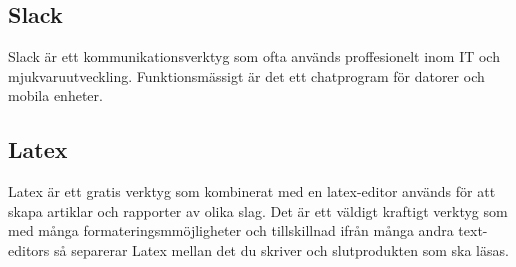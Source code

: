 \subsection*{Slack}
Slack är ett kommunikationsverktyg som ofta används proffesionelt inom IT och mjukvaruutveckling. Funktionsmässigt är det ett chatprogram för datorer och mobila enheter.

\subsection*{Latex}
Latex är ett gratis verktyg som kombinerat med en latex-editor används för att skapa artiklar och rapporter av olika slag. Det är ett väldigt kraftigt verktyg som med många formateringsmmöjligheter och tillskillnad ifrån många andra text-editors så separerar Latex mellan det du skriver och slutprodukten som ska läsas.
